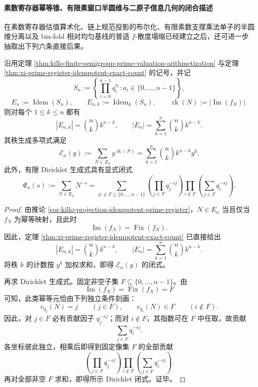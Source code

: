 \paragraph{素数寄存器幂等锥、有限素窗口半圆维与二原子信息几何的闭合描述}
在素数寄存器估值算术化、链上规范投影的布尔化、有限素数支撑乘法单子的半圆维分离以及 bin-fold 相对均匀基线的普适 \(f\)-散度塌缩已经建立之后，还可进一步抽取出下列六条直接后果。

\begin{theorem}\label{thm:xi-prime-register-idempotent-cone-rank-dirichlet}
沿用定理 \ref{thm:killo-finite-semigroup-prime-valuation-arithmetization} 与定理 \ref{thm:xi-prime-register-idempotent-exact-count} 的记号，并记
\[
S_n:=\left\{\prod_{i=0}^{n-1}q_i^{a_i}: a_i\in\{0,\dots,n-1\}\right\},
\]
\[
E_n:=\operatorname{Idem}(S_n),
\qquad
E_{n,k}:=\operatorname{Idem}_k(S_n),
\qquad
\operatorname{rk}(N):=|\operatorname{Im}(f_N)|.
\]
则对每个 \(1\le k\le n\) 都有
\[
|E_{n,k}|=\binom{n}{k}k^{n-k},
\qquad
|E_n|=\sum_{k=1}^{n}\binom{n}{k}k^{n-k}.
\]
其秩生成多项式满足
\[
\mathcal E_n(y):=\sum_{N\in E_n}y^{\operatorname{rk}(N)}
=
\sum_{k=1}^{n}\binom{n}{k}k^{n-k}y^k.
\]
此外，有限 Dirichlet 生成式具有显式闭式
\[
\mathfrak E_n(s):=\sum_{N\in E_n}N^{-s}
=
\sum_{\varnothing\neq F\subseteq\{0,\dots,n-1\}}
\left(\prod_{j\in F}q_j^{-sj}\right)
\prod_{i\notin F}\left(\sum_{j\in F}q_i^{-sj}\right).
\]
\end{theorem}
\begin{proof}
由推论 \ref{cor:killo-projection-idempotent-prime-register}，\(N\in E_n\) 当且仅当 \(f_N\) 为幂等映射，且此时
\[
\operatorname{Im}(f_N)=\operatorname{Fix}(f_N).
\]
因此，定理 \ref{thm:xi-prime-register-idempotent-exact-count} 已直接给出
\[
|E_{n,k}|=\binom{n}{k}k^{n-k},
\qquad
|E_n|=\sum_{k=1}^{n}\binom{n}{k}k^{n-k}.
\]
将秩 \(k\) 的计数按 \(y^k\) 加权求和，即得 \(\mathcal E_n(y)\) 的闭式。

再求 Dirichlet 生成式。固定非空子集 \(F\subseteq\{0,\dots,n-1\}\)。由
\[
\operatorname{Im}(f_N)=\operatorname{Fix}(f_N)=F
\]
可知，此类幂等元恰由下列独立条件刻画：
\[
v_{q_j}(N)=j\qquad (j\in F),
\qquad
v_{q_i}(N)\in F\qquad (i\notin F).
\]
因此，对 \(j\in F\) 必有贡献因子 \(q_j^{-sj}\)；而对 \(i\notin F\)，其指数可在 \(F\) 中任取，故贡献
\[
\sum_{j\in F}q_i^{-sj}.
\]
各坐标彼此独立，相乘后即得到固定像集 \(F\) 的全部贡献
\[
\left(\prod_{j\in F}q_j^{-sj}\right)
\prod_{i\notin F}\left(\sum_{j\in F}q_i^{-sj}\right).
\]
再对全部非空 \(F\) 求和，即得所示 Dirichlet 闭式。证毕。
\end{proof}

